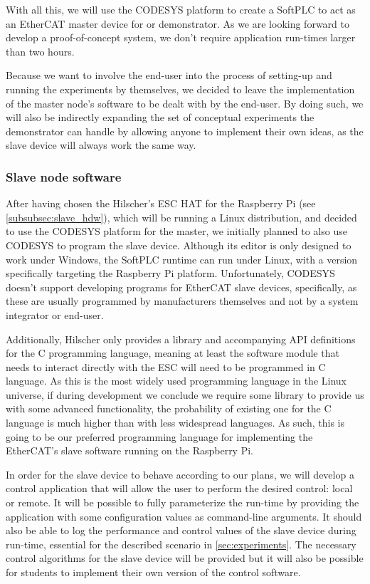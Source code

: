 With all this, we will use the CODESYS platform to create a SoftPLC to act as an EtherCAT master device for or demonstrator.
As we are looking forward to develop a proof-of-concept system, we don't require application run-times larger than two hours.

Because we want to involve the end-user into the process of setting-up and running the experiments by themselves, we decided to leave the implementation of the master node's software to be dealt with by the end-user.
By doing such, we will also be indirectly expanding the set of conceptual experiments the demonstrator can handle by allowing anyone to implement their own ideas, as the slave device will always work the same way.

\subsubsection{Slave node software}

After having chosen the Hilscher's ESC HAT for the Raspberry Pi (see \autoref{subsubsec:slave_hdw}), which will be running a Linux distribution, and decided to use the CODESYS platform for the master, we initially planned to also use CODESYS to program the slave device.
Although its editor is only designed to work under Windows, the SoftPLC runtime can run under Linux, with a version specifically targeting the Raspberry Pi platform.
Unfortunately, CODESYS doesn't support developing programs for EtherCAT slave devices, specifically, as these are usually programmed by manufacturers themselves and not by a system integrator or end-user.

Additionally, Hilscher only provides a library and accompanying API definitions for the C programming language, meaning at least the software module that needs to interact directly with the ESC will need to be programmed in C language.
As this is the most widely used programming language in the Linux universe, if during development we conclude we require some library to provide us with some advanced functionality, the probability of existing one for the C language is much higher than with less widespread languages.
As such, this is going to be our preferred programming language for implementing the EtherCAT's slave software running on the Raspberry Pi.

In order for the slave device to behave according to our plans, we will develop a control application that will allow the user to perform the desired control: local or remote.
It will be possible to fully parameterize the run-time by providing the application with some configuration values as command-line arguments.
It should also be able to log the performance and control values of the slave device during run-time, essential for the described scenario in \autoref{sec:experiments}.
The necessary control algorithms for the slave device will be provided but it will also be possible for students to implement their own version of the control software.
